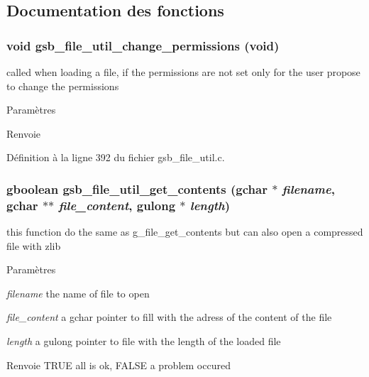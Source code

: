 \subsection{Documentation des fonctions}
\subsubsection[{gsb\_\-file\_\-util\_\-change\_\-permissions}]{\setlength{\rightskip}{0pt plus 5cm}void gsb\_\-file\_\-util\_\-change\_\-permissions (void)}\label{gsb__file__util_8c_a5860b25ee5eef286dbb07e812c66c0fd}
called when loading a file, if the permissions are not set only for the user propose to change the permissions


\begin{DoxyParams}{Paramètres}
\item[{\em }]\end{DoxyParams}
\begin{DoxyReturn}{Renvoie}

\end{DoxyReturn}


Définition à la ligne 392 du fichier gsb\_\-file\_\-util.c.

\subsubsection[{gsb\_\-file\_\-util\_\-get\_\-contents}]{\setlength{\rightskip}{0pt plus 5cm}gboolean gsb\_\-file\_\-util\_\-get\_\-contents (gchar $\ast$ {\em filename}, \/  gchar $\ast$$\ast$ {\em file\_\-content}, \/  gulong $\ast$ {\em length})}\label{gsb__file__util_8c_aa976d6f0795a4f897ac1092f95ca247c}
this function do the same as g\_\-file\_\-get\_\-contents but can also open a compressed file with zlib


\begin{DoxyParams}{Paramètres}
\item[{\em filename}]the name of file to open \item[{\em file\_\-content}]a gchar pointer to fill with the adress of the content of the file \item[{\em length}]a gulong pointer to file with the length of the loaded file\end{DoxyParams}
\begin{DoxyReturn}{Renvoie}
TRUE all is ok, FALSE a problem occured 
\end{DoxyReturn}


